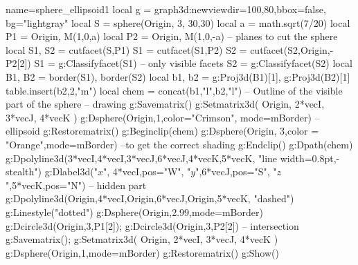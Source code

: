 \documentclass[border=5pt]{standalone}%
\begin{document}
\begin{luadraw}{name=sphere_ellipsoid1}
local g = graph3d:new{viewdir={100,80},bbox=false, bg="lightgray"}
local S = sphere(Origin, 3, 30,30)
local a = math.sqrt(7/20)
local P1 = {Origin, M(1,0,a)}
local P2 = {Origin, M(1,0,-a)} -- planes to cut the sphere
local S1, S2 = cutfacet(S,P1)
S1 = cutfacet(S1,P2)
S2 = cutfacet(S2,{Origin,-P2[2]})
S1 = g:Classifyfacet(S1) -- only visible facets
S2 = g:Classifyfacet(S2)
local B1, B2 = border(S1), border(S2)
local b1, b2 = g:Proj3d(B1)[1], g:Proj3d(B2)[1]
table.insert(b2,2,"m")
local chem = concat(b1,"l",b2,"l") -- Outline of the visible part of the sphere
-- drawing
g:Savematrix()
g:Setmatrix3d( {Origin, 2*vecI, 3*vecJ, 4*vecK} )
g:Dsphere(Origin,1,{color="Crimson", mode=mBorder}) -- ellipsoid
g:Restorematrix()
g:Beginclip(chem)
g:Dsphere(Origin, 3,{color = "Orange",mode=mBorder}) --to get the correct shading
g:Endclip()
g:Dpath(chem)
g:Dpolyline3d({{3*vecI,4*vecI},{3*vecJ,6*vecJ},{4*vecK,5*vecK}}, "line width=0.8pt,-stealth")
g:Dlabel3d("$x$", 4*vecI,{pos="W"}, "$y$",6*vecJ,{pos="S"}, "$z$",5*vecK,{pos="N"})
-- hidden part
g:Dpolyline3d({{Origin,4*vecI},{Origin,6*vecJ},{Origin,5*vecK}}, "dashed")
g:Linestyle("dotted")
g:Dsphere(Origin,2.99,{mode=mBorder})
g:Dcircle3d(Origin,3,P1[2]); g:Dcircle3d(Origin,3,P2[2]) -- intersection
g:Savematrix(); g:Setmatrix3d( {Origin, 2*vecI, 3*vecJ, 4*vecK} )
g:Dsphere(Origin,1,{mode=mBorder})
g:Restorematrix()
g:Show()
\end{luadraw}
\end{document}
